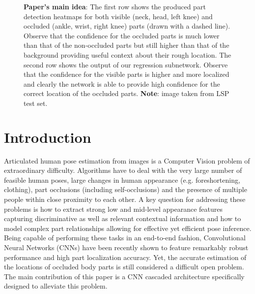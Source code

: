 \documentclass[runningheads]{llncs}
\begin{document}
\begin{figure*}
    \centering
	
	\centering
	
	\caption{\textbf{Paper's main idea}: The first row shows the produced part detection heatmaps for both visible (neck, head, left knee) and occluded (ankle, wrist, right knee) parts (drawn with a dashed line). Observe that the confidence for the occluded parts is much lower than that of the non-occluded parts but still higher than that of the background providing useful context about their rough location. The second row shows the output of our regression subnetwork. Observe that the confidence for the visible parts is higher and more localized and clearly the network is able to provide high confidence for the correct location of the occluded parts. \textbf{Note}: image taken from LSP test set.}
\label{fig:idea}
\end{figure*}

\section{Introduction}
Articulated human pose estimation from images is a Computer Vision problem of extraordinary difficulty. Algorithms have to deal with the very large number of feasible human poses, large changes in human appearance (e.g. foreshortening, clothing), part occlusions (including self-occlusions) and the presence of multiple people within close proximity to each other. A key question for addressing these problems is how to extract strong low and mid-level appearance features capturing discriminative as well as relevant contextual information and how to model complex part relationships allowing for effective yet efficient pose inference. Being capable of performing these tasks in an end-to-end fashion, Convolutional Neural Networks (CNNs) have been recently shown to feature remarkably robust performance and high part localization accuracy. Yet, the accurate estimation of the locations of occluded body parts is still considered a difficult open problem. The main contribution of this paper is a CNN cascaded architecture specifically designed to alleviate this problem.  
\end{document}

